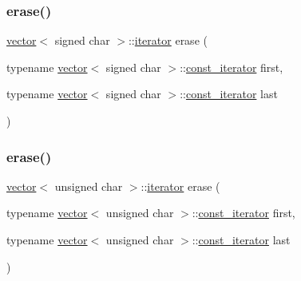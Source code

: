 \mbox{\label{classvector_a10ce0789a2db33cc8c5bc21ac5684603}} 
\subsubsection{\texorpdfstring{erase()}{erase()}\hspace{0.1cm}{\footnotesize\ttfamily [18/28]}}
{\footnotesize\ttfamily \mbox{\hyperlink{classvector}{vector}}$<$ signed char $>$\+::\mbox{\hyperlink{classvector_a35c955cacac6aacaa1e82874b1628865}{iterator}} erase (\begin{DoxyParamCaption}\item[{typename \mbox{\hyperlink{classvector}{vector}}$<$ signed char $>$\+::\mbox{\hyperlink{classvector_a2fc97dce62b7053449cc868607540dba}{const\+\_\+iterator}}}]{first,  }\item[{typename \mbox{\hyperlink{classvector}{vector}}$<$ signed char $>$\+::\mbox{\hyperlink{classvector_a2fc97dce62b7053449cc868607540dba}{const\+\_\+iterator}}}]{last }\end{DoxyParamCaption})}

\mbox{\label{classvector_a0962d864a81db04b03e799375a6c7ffb}} 
\subsubsection{\texorpdfstring{erase()}{erase()}\hspace{0.1cm}{\footnotesize\ttfamily [19/28]}}
{\footnotesize\ttfamily \mbox{\hyperlink{classvector}{vector}}$<$ unsigned char $>$\+::\mbox{\hyperlink{classvector_a35c955cacac6aacaa1e82874b1628865}{iterator}} erase (\begin{DoxyParamCaption}\item[{typename \mbox{\hyperlink{classvector}{vector}}$<$ unsigned char $>$\+::\mbox{\hyperlink{classvector_a2fc97dce62b7053449cc868607540dba}{const\+\_\+iterator}}}]{first,  }\item[{typename \mbox{\hyperlink{classvector}{vector}}$<$ unsigned char $>$\+::\mbox{\hyperlink{classvector_a2fc97dce62b7053449cc868607540dba}{const\+\_\+iterator}}}]{last }\end{DoxyParamCaption})}

\mbox{\label{classvector_a357ed36e761b619903982819801be606}} 
